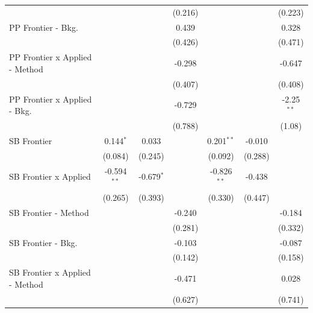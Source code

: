 \begin{tabular}{lcccccc}
                                  &               &              & (0.216) &               &         & (0.223)\\   
   PP Frontier - Bkg.             &               &              & 0.439   &               &         & 0.328\\   
                                  &               &              & (0.426) &               &         & (0.471)\\   
   PP Frontier x Applied - Method &               &              & -0.298  &               &         & -0.647\\   
                                  &               &              & (0.407) &               &         & (0.408)\\   
   PP Frontier x Applied - Bkg.   &               &              & -0.729  &               &         & -2.25$^{**}$\\   
                                  &               &              & (0.788) &               &         & (1.08)\\   
   SB Frontier                    & 0.144$^{*}$   & 0.033        &         & 0.201$^{**}$  & -0.010  &   \\   
                                  & (0.084)       & (0.245)      &         & (0.092)       & (0.288) &   \\   
   SB Frontier x Applied          & -0.594$^{**}$ & -0.679$^{*}$ &         & -0.826$^{**}$ & -0.438  &   \\   
                                  & (0.265)       & (0.393)      &         & (0.330)       & (0.447) &   \\   
   SB Frontier - Method           &               &              & -0.240  &               &         & -0.184\\   
                                  &               &              & (0.281) &               &         & (0.332)\\   
   SB Frontier - Bkg.             &               &              & -0.103  &               &         & -0.087\\   
                                  &               &              & (0.142) &               &         & (0.158)\\   
   SB Frontier x Applied - Method &               &              & -0.471  &               &         & 0.028\\   
                                  &               &              & (0.627) &               &         & (0.741)\\   

\end{tabular}

